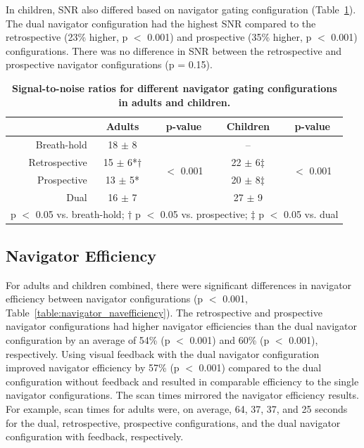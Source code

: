 	In children, SNR also differed based on navigator gating configuration (Table~\ref{table:navigator_snr}). The dual navigator configuration had the highest SNR compared to the retrospective (23\% higher, p $<$ 0.001) and prospective (35\% higher, p $<$ 0.001) configurations. There was no difference in SNR between the retrospective and prospective navigator configurations (p = 0.15).

	\begin{table}
		\centering
		\caption[Signal-to-noise ratios for different navigator gating configurations in adults and children]{\textbf{Signal-to-noise ratios for different navigator gating configurations in adults and children.}}
		\label{table:navigator_snr}
		\begin{tabular}{c c c c c}
			\toprule
			\multicolumn{1}{c}{} & \multicolumn{1}{c}{\textbf{Adults}} & \multicolumn{1}{c}{\textbf{p-value}} & \multicolumn{1}{c}{\textbf{Children}} & \multicolumn{1}{c}{\textbf{p-value}} \\ \midrule
			\multicolumn{1}{r}{Breath-hold}      & \multicolumn{1}{c}{18 $\pm$ 8} & \multirow{4}{*}{$<$ 0.001} & \multicolumn{1}{c}{--} & \multirow{4}{*}{$<$ 0.001}     \\
			\multicolumn{1}{r}{Retrospective}    & \multicolumn{1}{c}{15 $\pm$ 6*$\dagger$} & & \multicolumn{1}{c}{22 $\pm$ 6$\ddagger$} &                 \\
			\multicolumn{1}{r}{Prospective}      & \multicolumn{1}{c}{13 $\pm$ 5*} & & \multicolumn{1}{c}{20 $\pm$ 8$\ddagger$} &                 \\
			\multicolumn{1}{r}{Dual}    		 & \multicolumn{1}{c}{16 $\pm$ 7} & & \multicolumn{1}{c}{27 $\pm$ 9} &                 \\
			\bottomrule
			\multicolumn{5}{l}{\footnotesize* p $<$ 0.05 vs. breath-hold; $\dagger$ p $<$ 0.05 vs. prospective; $\ddagger$ p $<$ 0.05 vs. dual} \\
		\end{tabular}
	\end{table}

\subsection{Navigator Efficiency}
	For adults and children combined, there were significant differences in navigator efficiency between navigator configurations (p $<$ 0.001, Table~\ref{table:navigator_navefficiency}). The retrospective and prospective navigator configurations had higher navigator efficiencies than the dual navigator configuration by an average of 54\% (p $<$ 0.001) and 60\% (p $<$ 0.001), respectively. Using visual feedback with the dual navigator configuration improved navigator efficiency by 57\% (p $<$ 0.001) compared to the dual configuration without feedback and resulted in comparable efficiency to the single navigator configurations. The scan times mirrored the navigator efficiency results. For example, scan times for adults were, on average, 64, 37, 37, and 25 seconds for the dual, retrospective, prospective configurations, and the dual navigator configuration with feedback, respectively.

